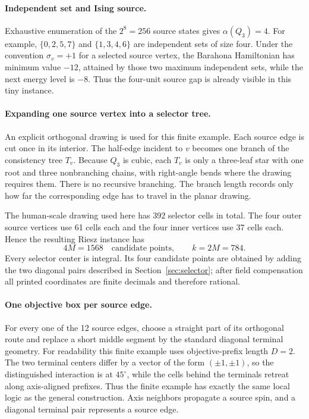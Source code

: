 \documentclass[12pt,a4paper]{article}
\begin{document}
\paragraph{Independent set and Ising source.}
Exhaustive enumeration of the $2^8=256$ source states gives $\alpha(Q_3)=4$.  For example, $\{0,2,5,7\}$ and $\{1,3,4,6\}$ are independent sets of size four.  Under the convention $\sigma_v=+1$ for a selected source vertex, the Barahona Hamiltonian has minimum value $-12$, attained by those two maximum independent sets, while the next energy level is $-8$.  Thus the four-unit source gap is already visible in this tiny instance.

\paragraph{Expanding one source vertex into a selector tree.}
An explicit orthogonal drawing is used for this finite example.  Each source edge is cut once in its interior.  The half-edge incident to $v$ becomes one branch of the consistency tree $T_v$.  Because $Q_3$ is cubic, each $T_v$ is only a three-leaf star with one root and three nonbranching chains, with right-angle bends where the drawing requires them.  There is no recursive branching.  The branch length records only how far the corresponding edge has to travel in the planar drawing.

The human-scale drawing used here has 392 selector cells in total.  The four outer source vertices use 61 cells each and the four inner vertices use 37 cells each.  Hence the resulting Riesz instance has
\[
 4M=1568\quad\text{candidate points},\qquad k=2M=784.
\]
Every selector center is integral.  Its four candidate points are obtained by adding the two diagonal pairs described in Section~\ref{sec:selector}; after field compensation all printed coordinates are finite decimals and therefore rational.

\paragraph{One objective box per source edge.}
For every one of the 12 source edges, choose a straight part of its orthogonal route and replace a short middle segment by the standard diagonal terminal geometry.  For readability this finite example uses objective-prefix length $D=2$.  The two terminal centers differ by a vector of the form $(\pm1,\pm1)$, so the distinguished interaction is at $45^\circ$, while the cells behind the terminals retreat along axis-aligned prefixes.  Thus the finite example has exactly the same local logic as the general construction.  Axis neighbors propagate a source spin, and a diagonal terminal pair represents a source edge.
\end{document}
